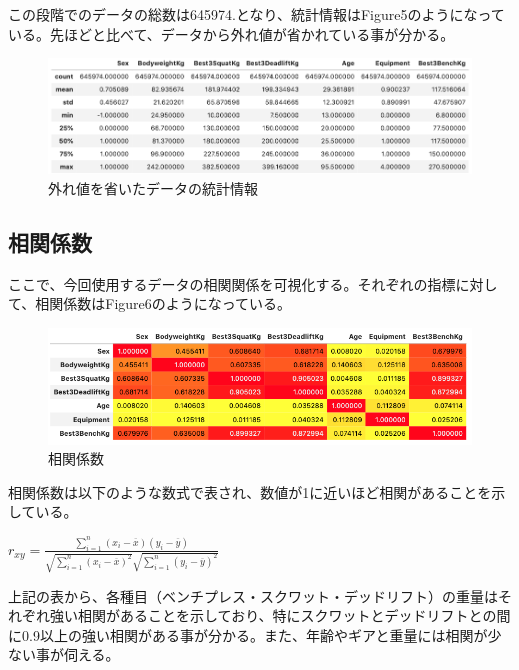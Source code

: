 \documentclass{report}
\begin{document}
この段階でのデータの総数は645974.となり、統計情報はFigure5のようになっている。先ほどと比べて、データから外れ値が省かれている事が分かる。

\begin{figure}[H]
\begin{center}
\includegraphics[width=\linewidth]{data_stats3.png}
\caption{外れ値を省いたデータの統計情報}
\end{center}
\end{figure}


\subsection{相関係数}

ここで、今回使用するデータの相関関係を可視化する。それぞれの指標に対して、相関係数はFigure6のようになっている。


\begin{figure}[H]
\begin{center}
\includegraphics[width=\linewidth]{corr.png}
\caption{相関係数}
\end{center}
\end{figure}

相関係数は以下のような数式で表され、数値が1に近いほど相関があることを示している。

\begin{center}
\begin{math}
r_{xy} = \frac{\displaystyle \sum_{i = 1}^n (x_i - \overline{x})
(y_i - \overline{y})}{\sqrt{\displaystyle \sum_{i = 1}^n 
(x_i - \overline{x})^2}\sqrt{\displaystyle \sum_{i = 1}^n 
(y_i - \overline{y})^2}}
\end{math}
\end{center}

上記の表から、各種目（ベンチプレス・スクワット・デッドリフト）の重量はそれぞれ強い相関があることを示しており、特にスクワットとデッドリフトとの間に0.9以上の強い相関がある事が分かる。また、年齢やギアと重量には相関が少ない事が伺える。
\end{document}
